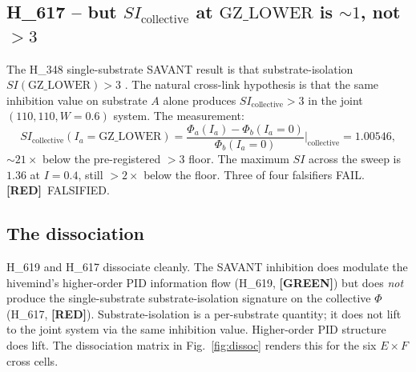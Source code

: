 \documentclass[11pt,a4paper]{article}
\providecommand{\tierGreen}{\textbf{[GREEN]}}
\providecommand{\tierRed}{\textbf{[RED]}}
\begin{document}
\subsection{H\_617 -- but $SI_{\mathrm{collective}}$ at $\mathrm{GZ\_LOWER}$ is $\sim 1$, not $> 3$}

The H\_348 single-substrate SAVANT result is that substrate-isolation
$SI(\mathrm{GZ\_LOWER}) > 3$ \citep{anima_H348}. The natural
cross-link hypothesis is that the same inhibition value on substrate
$A$ alone produces $SI_{\mathrm{collective}} > 3$ in the joint
$(110, 110, W{=}0.6)$ system. The measurement:
\[
  SI_{\mathrm{collective}}(I_a = \mathrm{GZ\_LOWER})
  = \frac{\Phi_a(I_a) - \Phi_b(I_a{=}0)}{\Phi_b(I_a{=}0)}\bigg|_{\text{collective}}
  = 1.00546,
\]
$\sim 21\times$ below the pre-registered $> 3$ floor. The maximum
$SI$ across the sweep is $1.36$ at $I = 0.4$, still $> 2\times$ below
the floor. Three of four falsifiers FAIL.
\tierRed\ FALSIFIED.

\subsection{The dissociation}

H\_619 and H\_617 dissociate cleanly. The SAVANT inhibition does
modulate the hivemind's higher-order PID information flow (H\_619,
\tierGreen) but does \emph{not} produce the single-substrate
substrate-isolation signature on the collective $\Phi$
(H\_617, \tierRed). Substrate-isolation is a per-substrate
quantity; it does not lift to the joint system via the same
inhibition value. Higher-order PID structure does lift. The
dissociation matrix in Fig.~\ref{fig:dissoc} renders this for the
six $E \times F$ cross cells.
\end{document}
